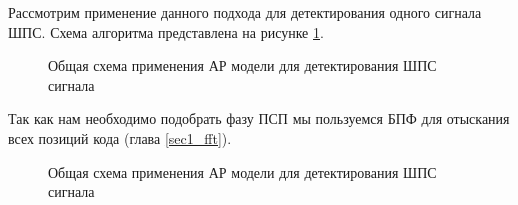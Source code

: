 Рассмотрим применение данного подхода для детектирования одного сигнала ШПС. Схема алгоритма представлена на рисунке \ref{pic:lpc_basic}.
\begin{figure}[H]
	\center{}
	\caption{Общая схема применения АР модели для детектирования ШПС сигнала}
	\label{pic:lpc_basic}
\end{figure}
Так как нам необходимо подобрать фазу ПСП мы пользуемся БПФ для отыскания всех позиций кода (глава \ref{sec1_fft}).

\begin{figure}[H]
	\center{}
	\caption{Общая схема применения АР модели для детектирования ШПС сигнала}
	\label{pic:lpc_1sat}
\end{figure}

\newpage
